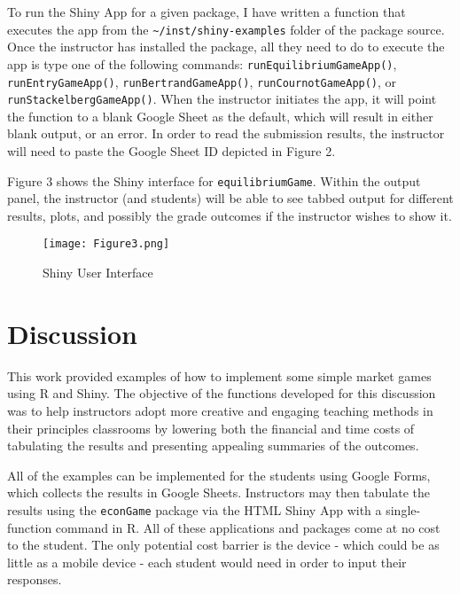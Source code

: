 \documentclass[
]{article}
\begin{document}
To run the Shiny App for a given package, I have written a function that
executes the app from the
\texttt{\textquotesingle{}\textasciitilde{}/inst/shiny-examples\textquotesingle{}}
folder of the package source. Once the instructor has installed the
package, all they need to do to execute the app is type one of the
following commands:
\texttt{\textquotesingle{}runEquilibriumGameApp()\textquotesingle{}},
\texttt{\textquotesingle{}runEntryGameApp()\textquotesingle{}},
\texttt{\textquotesingle{}runBertrandGameApp()\textquotesingle{}},
\texttt{\textquotesingle{}runCournotGameApp()\textquotesingle{}}, or
\texttt{\textquotesingle{}runStackelbergGameApp()\textquotesingle{}}.
When the instructor initiates the app, it will point the function to a
blank Google Sheet as the default, which will result in either blank
output, or an error. In order to read the submission results, the
instructor will need to paste the Google Sheet ID depicted in Figure 2.

Figure 3 shows the Shiny interface for \texttt{equilibriumGame}. Within
the output panel, the instructor (and students) will be able to see
tabbed output for different results, plots, and possibly the grade
outcomes if the instructor wishes to show it.

\begin{figure}
\centering
\texttt{[image: Figure3.png]}
\caption{Shiny User Interface}
\end{figure}

\hypertarget{discussion}{%
\section{Discussion}\label{discussion}}

This work provided examples of how to implement some simple market games
using R and Shiny. The objective of the functions developed for this
discussion was to help instructors adopt more creative and engaging
teaching methods in their principles classrooms by lowering both the
financial and time costs of tabulating the results and presenting
appealing summaries of the outcomes.

All of the examples can be implemented for the students using Google
Forms, which collects the results in Google Sheets. Instructors may then
tabulate the results using the \texttt{econGame} package via the HTML
Shiny App with a single-function command in R. All of these applications
and packages come at no cost to the student. The only potential cost
barrier is the device - which could be as little as a mobile device -
each student would need in order to input their responses.
\end{document}
